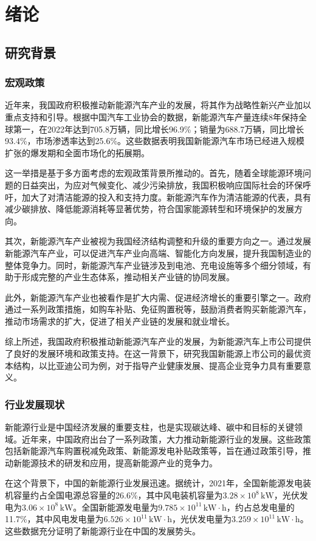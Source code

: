 \chapter{绪论}
\section{研究背景}
\subsection{宏观政策}
近年来，我国政府积极推动新能源汽车产业的发展，将其作为战略性新兴产业加以重点支持和引导。根据中国汽车工业协会的数据，新能源汽车产量连续8年保持全球第一，在2022年达到705.8万辆，同比增长96.9\%；销量为688.7万辆，同比增长93.4\%，市场渗透率达到25.6\%。这些数据表明我国新能源汽车市场已经进入规模扩张的爆发期和全面市场化的拓展期。

这一举措是基于多方面考虑的宏观政策背景所推动的。首先，随着全球能源环境问题的日益突出，为应对气候变化、减少污染排放，我国积极响应国际社会的环保呼吁，加大了对清洁能源的投入和支持力度。新能源汽车作为清洁能源的代表，具有减少碳排放、降低能源消耗等显著优势，符合国家能源转型和环境保护的发展方向。

其次，新能源汽车产业被视为我国经济结构调整和升级的重要方向之一。通过发展新能源汽车产业，可以促进汽车产业向高端、智能化方向发展，提升我国制造业的整体竞争力。同时，新能源汽车产业链涉及到电池、充电设施等多个细分领域，有助于形成完整的产业生态体系，推动相关产业链的协同发展。

此外，新能源汽车产业也被看作是扩大内需、促进经济增长的重要引擎之一。政府通过一系列政策措施，如购车补贴、免征购置税等，鼓励消费者购买新能源汽车，推动市场需求的扩大，促进了相关产业链的发展和就业增长。

综上所述，我国政府积极推动新能源汽车产业的发展，为新能源汽车上市公司提供了良好的发展环境和政策支持。在这一背景下，研究我国新能源上市公司的最优资本结构，以比亚迪公司为例，对于指导产业健康发展、提高企业竞争力具有重要意义。

\subsection{行业发展现状}
新能源行业是中国经济发展的重要支柱，也是实现碳达峰、碳中和目标的关键领域。近年来，中国政府出台了一系列政策，大力推动新能源行业的发展。这些政策包括新能源汽车购置税减免政策、新能源发电补贴政策等，旨在通过政策引导，推动新能源技术的研发和应用，提高新能源产业的竞争力。

在这个背景下，中国的新能源行业发展迅速。据统计，2021年，全国新能源发电装机容量约占全国电源总容量的26.6\%，其中风电装机容量为$3.28 \times 10^{8} \, \text{kW}$，光伏发电为$3.06 \times 10^{8} \, \text{kW}$。全国新能源发电量为$9.785 \times 10^{11} \, \text{kW} \cdot \text{h}$，约占总发电量的11.7\%，其中风电发电量为$6.526\times 10^{11} \, \text{kW} \cdot \text{h}$，光伏发电量为$3.259 \times 10^{11} \, \text{kW} \cdot \text{h}$。这些数据充分证明了新能源行业在中国的发展势头。

